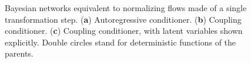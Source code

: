 \begin{figure}
\begin{subfigure}{.5\textwidth}
        \caption{} \label{fig:mono-step-flows-c}
    \end{subfigure}
    \caption{Bayesian networks equivalent to normalizing flows made of a single transformation step. (\textbf{a}) Autoregressive conditioner. (\textbf{b}) Coupling conditioner. (\textbf{c}) Coupling conditioner, with latent variables  shown explicitly. Double circles stand for deterministic functions of the parents.} \label{fig:mono-step-flows}
\end{figure}

